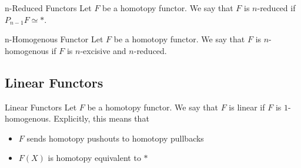 \documentclass[a4paper]{article}
\begin{document}
\begin{defn}{n-Reduced Functors}{} Let $F$ be a homotopy functor. We say that $F$ is $n$-reduced if $P_{n-1}F\simeq\ast$. 
\end{defn}

\begin{defn}{n-Homogenous Functor}{} Let $F$ be a homotopy functor. We say that $F$ is $n$-homogenous if $F$ is $n$-excisive and $n$-reduced. 
\end{defn}

\subsection{Linear Functors}
\begin{defn}{Linear Functors}{} Let $F$ be a homotopy functor. We say that $F$ is linear if $F$ is $1$-homogenous. Explicitly, this means that 
\begin{itemize}
\item $F$ sends homotopy pushouts to homotopy pullbacks
\item $F(X)$ is homotopy equivalent to $\ast$
\end{itemize}
\end{defn}
\end{document}
